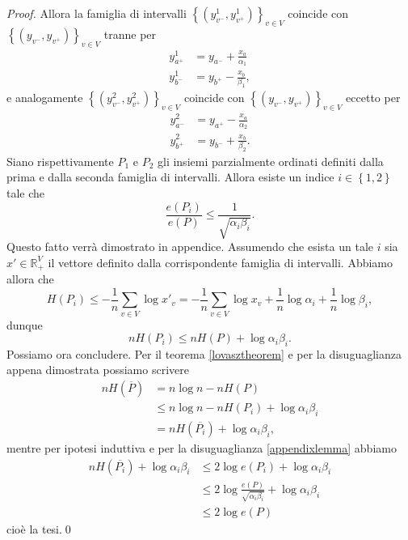 \begin{proof}
	Allora la famiglia di intervalli \(\left\{\left(y_{v^-}^1, y_{v^+}^1\right)\right\}_{v\in V}\) coincide con \(\left\{\left(y_{v^-}, y_{v^+}\right)\right\}_{v\in V}\) tranne per 
	\begin{align}
		y_{a^+}^1 &= y_{a^-} + \frac{x_a}{\alpha_1} \nonumber \\
		y_{b^-}^1 &= y_{b^+} - \frac{x_b}{\beta_1}, \nonumber 
	\end{align}
	e analogamente \(\left\{\left(y_{v^-}^2, y_{v^+}^2\right)\right\}_{v\in V}\) coincide con \(\left\{\left(y_{v^-}, y_{v^+}\right)\right\}_{v\in V}\) eccetto per 
	\begin{align}
		y_{a^-}^2 &= y_{a^+} - \frac{x_a}{\alpha_2} \nonumber \\
		y_{b^+}^2 &= y_{b^-} + \frac{x_b}{\beta_2}. \nonumber 
	\end{align}
	Siano rispettivamente \(P_1\) e \(P_2\) gli insiemi parzialmente ordinati definiti dalla prima e dalla seconda famiglia di intervalli. Allora esiste un indice \(i\in\left\{1,2\right\}\) tale che 
	\begin{equation}
		\label{appendixlemma} \frac{e(P_i)}{e(P)}\le\frac{1}{\sqrt{\alpha_i\beta_i}}. 
	\end{equation}
	Questo fatto verrà dimostrato in appendice. Assumendo che esista un tale \(i\) sia \(x'\in\mathbb{R}_{+}^V\) il vettore definito dalla corrispondente famiglia di intervalli. Abbiamo allora che
	\[H(P_i)\le-\frac{1}{n}\sum_{v\in V}{\log{x'_v}=-\frac{1}{n}\sum_{v\in V}{\log{x_v}}+\frac{1}{n}\log{\alpha_i}+\frac{1}{n}\log{\beta_i}},\]
	dunque
	\[nH(P_i)\le nH(P)+\log{\alpha_i\beta_i}.\]
	Possiamo ora concludere. Per il teorema \ref{lovasztheorem} e per la disuguaglianza appena dimostrata possiamo scrivere 
	\begin{align}
		nH(\overline{P}) &= n\log{n}-nH(P) \nonumber \\
		&\le n\log{n}-nH(P_i)+\log{\alpha_i\beta_i} \nonumber \\
		&= nH(\overline{P_i})+\log{\alpha_i\beta_i}, \nonumber 
	\end{align}
	mentre per ipotesi induttiva e per la disuguaglianza \ref{appendixlemma} abbiamo 
	\begin{align}
		nH(\overline{P_i})+\log{\alpha_i\beta_i} &\le 2\log{e(P_i)}+\log{\alpha_i\beta_i} \nonumber \\
		&\le 2\log{\frac{e(P)}{\sqrt{\alpha_i\beta_i}}}+\log{\alpha_i\beta_i} \nonumber \\
		&\le 2\log{e(P)} \nonumber 
	\end{align}
	cioè la tesi.\qed 
\end{proof}


